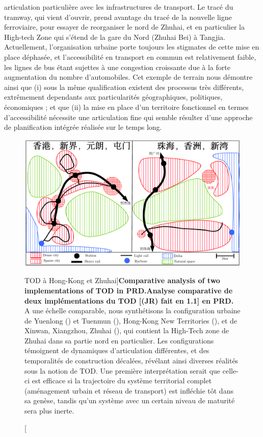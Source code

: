 {articulation particulière avec les infrastructures de transport. Le tracé du tramway, qui vient d'ouvrir, prend avantage du tracé de la nouvelle ligne ferroviaire, pour essayer de reorganiser le nord de Zhuhai, et en particulier la High-tech Zone qui s'étend de la gare du Nord (Zhuhai Bei) à Tangjia. Actuellement, l'organisation urbaine porte toujours les stigmates  de cette mise en place déphasée, et l'accessibilité en transport en commun est relativement faible, les lignes de bus étant sujettes à une congestion croissante due à la forte augmentation du nombre d'automobiles. Cet exemple de terrain nous démontre ainsi que (i) sous la même qualification existent des processus très différents, extrêmement dependants aux particularités géographiques, politiques, économiques ; et que (ii) la mise en place d'un territoire fonctionnel en termes d'accessibilité nécessite une articulation fine qui semble résulter d'une approche de planification intégrée réalisée sur le temps long.
}



\begin{figure}
	\includegraphics[width=\linewidth]{Figures/Qualitative/tod}
	\caption[TOD in Hong-Kong and Zhuhai][TOD à Hong-Kong et Zhuhai]{\textbf{Comparative analysis of two implementations of TOD in PRD.}\label{fig:qualitative:schema}}{\textbf{Analyse comparative de deux implémentations du TOD [(JR) fait en 1.1] en PRD.} A une échelle comparable, nous synthétisons la configuration urbaine de Yuenlong () et Tuenmun (), Hong-Kong New Territories (), et de Xinwan, Xiangzhou, Zhuhai (), qui contient la High-Tech zone de Zhuhai dans sa partie nord en particulier. Les configurations témoignent de dynamiques d'articulation différentes, et des temporalités de construction décalées, révélant ainsi diverses réalités sous la notion de TOD. Une première interprétation serait que celle-ci est efficace si la trajectoire du système territorial complet (aménagement urbain et réseau de transport) est infléchie tôt dans sa genèse, tandis qu'un système avec un certain niveau de maturité sera plus inerte.\label{fig:qualitative:schema}}
\end{figure}




